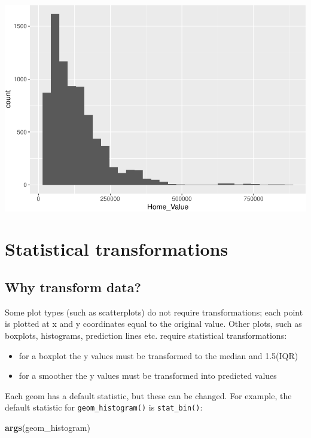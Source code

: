 \documentclass[
]{book}
\newenvironment{Shaded}{\begin{snugshade}}{\end{snugshade}}
\newcommand{\KeywordTok}[1]{\textcolor[rgb]{0.13,0.29,0.53}{\textbf{#1}}}
\newcommand{\NormalTok}[1]{#1}
\providecommand{\tightlist}{%
  \setlength{\itemsep}{0pt}\setlength{\parskip}{0pt}}
\begin{document}
\begin{alert}
\includegraphics{R/Rgraphics/figures/unnamed-chunk-163-1.pdf}

\end{alert}

\hypertarget{statistical-transformations}{%
\section{Statistical transformations}\label{statistical-transformations}}

\hypertarget{why-transform-data}{%
\subsection{Why transform data?}\label{why-transform-data}}

Some plot types (such as scatterplots) do not require transformations; each point is plotted at x and y coordinates equal to the original value. Other plots, such as boxplots, histograms, prediction lines etc. require statistical transformations:

\begin{itemize}
\tightlist
\item
  for a boxplot the y values must be transformed to the median and 1.5(IQR)
\item
  for a smoother the y values must be transformed into predicted values
\end{itemize}

Each geom has a default statistic, but these can be changed. For example, the default statistic for \texttt{geom\_histogram()} is \texttt{stat\_bin()}:

\begin{Shaded}
\begin{Highlighting}[]
\KeywordTok{args}\NormalTok{(geom\_histogram)}
\end{Highlighting}
\end{Shaded}
\end{document}
